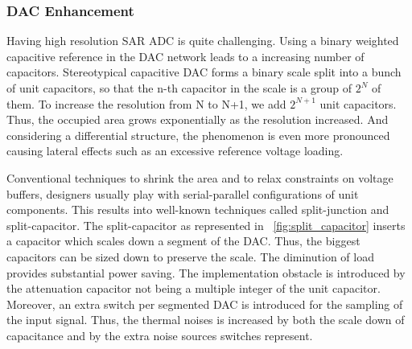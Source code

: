\subsubsection{DAC Enhancement}	
Having high resolution SAR ADC is quite challenging. Using a binary weighted capacitive reference in the DAC network leads to a increasing number of capacitors. Stereotypical capacitive DAC forms a binary scale split into a bunch of unit capacitors, so that the n-th capacitor in the scale is a group of \(2^N\) of them. To increase the resolution from N to N+1, we add \(2^{N+1}\) unit capacitors. Thus, the occupied area grows exponentially as the resolution increased. And considering a differential structure, the phenomenon is even more pronounced causing lateral effects such as an excessive reference voltage loading.

Conventional techniques to shrink the area and to relax constraints on voltage buffers, designers usually play with serial-parallel configurations of unit components. This results into well-known techniques called split-junction and split-capacitor. The split-capacitor as represented in \figurename~\ref{fig:split_capacitor} inserts a capacitor which scales down a segment of the DAC\@. Thus, the biggest capacitors can be sized down to preserve the scale. The diminution of load provides substantial power saving. The implementation obstacle is introduced by the attenuation capacitor not being a multiple integer of the unit capacitor. Moreover, an extra switch per segmented DAC is introduced for the sampling of the input signal. Thus, the thermal noises is increased by both the scale down of capacitance and by the extra noise sources switches represent.

